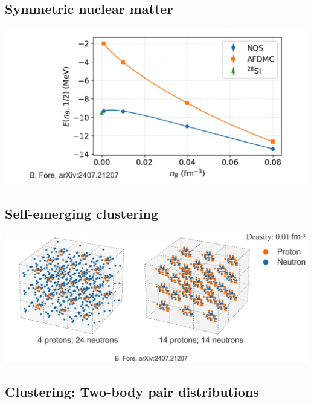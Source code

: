 \documentclass[%
oneside,                 %
final,                   %
10pt]{article}
\begin{document}
\subsection{Symmetric nuclear matter}

\vspace{6mm}

\centerline{\includegraphics[width=1.0\linewidth]{figures/mbpfig6.png}}

\vspace{6mm}

\subsection{Self-emerging clustering}

\vspace{6mm}

\centerline{\includegraphics[width=1.0\linewidth]{figures/mbpfig7.png}}

\vspace{6mm}

\subsection{Clustering: Two-body pair distributions}
\end{document}
